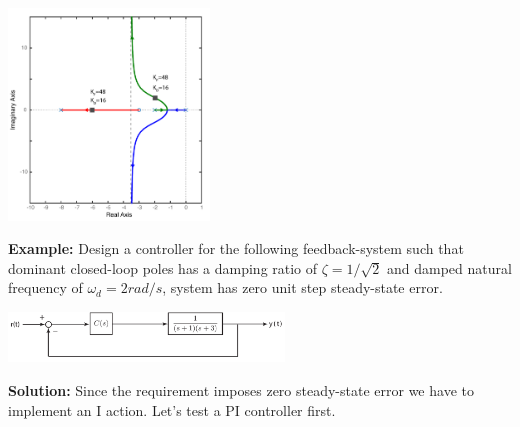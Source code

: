 \documentclass[twoside]{article}
\begin{document}
  \begin{minipage}[h]{1\linewidth}
    \begin{center}
      \includegraphics[width=0.4\textwidth]{PDdesignLocus}
    \end{center}
  \end{minipage}

\vspace{3 pt}

\vspace{12 pt}

\textbf{Example:} Design a controller for the following
feedback-system such that dominant closed-loop poles
has a damping ratio of $\zeta = 1/\sqrt{2}$ and damped natural
frequency of $\omega_d = 2 rad/s$, system has zero
unit step steady-state error. 

\vspace{6 pt}

  \begin{minipage}[h]{1\linewidth}
    \begin{center}
      \includegraphics[width=0.55\textwidth]{example2}
    \end{center}
  \end{minipage}

\vspace{6 pt}

\textbf{Solution:} Since the requirement imposes zero steady-state
error we have to implement an I action. Let's test a PI controller 
first. 
\end{document}
